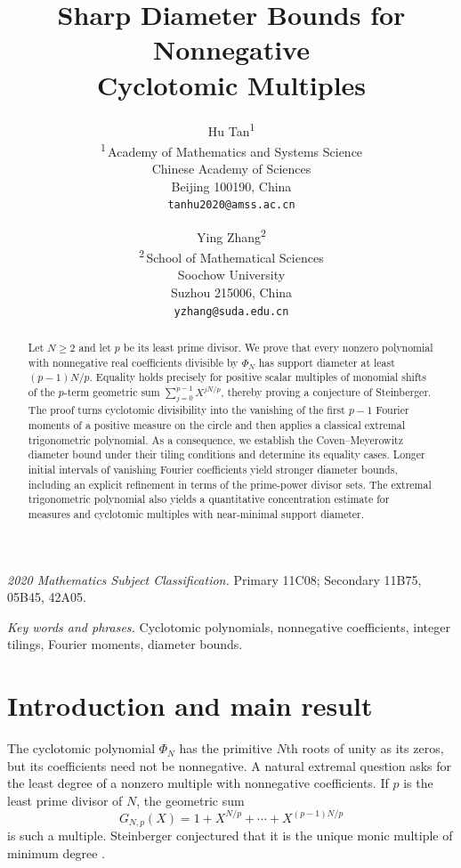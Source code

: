 \documentclass[11pt]{article}
\title{Sharp Diameter Bounds for Nonnegative\\Cyclotomic Multiples}
\author{%
\begin{tabular}[t]{c}
Hu Tan\textsuperscript{1}\\[3pt]
\small\textsuperscript{1}\,Academy of Mathematics and Systems Science\\
\small Chinese Academy of Sciences\\
\small Beijing 100190, China\\
\small\texttt{tanhu2020@amss.ac.cn}
\end{tabular}
\and
\begin{tabular}[t]{c}
Ying Zhang\textsuperscript{2}\\[3pt]
\small\textsuperscript{2}\,School of Mathematical Sciences\\
\small Soochow University\\
\small Suzhou 215006, China\\
\small\texttt{yzhang@suda.edu.cn}
\end{tabular}%
}
\date{}
\theoremstyle{definition}
\theoremstyle{remark}
\numberwithin{equation}{section}
\begin{document}
\maketitle
\begin{abstract}
Let \(N\ge2\) and let \(p\) be its least prime divisor. We prove that every nonzero polynomial with nonnegative real coefficients divisible by \(\Phi_N\) has support diameter at least \((p-1)N/p\). Equality holds precisely for positive scalar multiples of monomial shifts of the \(p\)-term geometric sum \(\sum_{j=0}^{p-1} X^{jN/p}\), thereby proving a conjecture of Steinberger. The proof turns cyclotomic divisibility into the vanishing of the first \(p-1\) Fourier moments of a positive measure on the circle and then applies a classical extremal trigonometric polynomial. As a consequence, we establish the Coven--Meyerowitz diameter bound under their tiling conditions and determine its equality cases. Longer initial intervals of vanishing Fourier coefficients yield stronger diameter bounds, including an explicit refinement in terms of the prime-power divisor sets. The extremal trigonometric polynomial also yields a quantitative concentration estimate for measures and cyclotomic multiples with near-minimal support diameter.


\end{abstract}

\noindent\textit{2020 Mathematics Subject Classification.}
Primary 11C08; Secondary 11B75, 05B45, 42A05.

\smallskip
\noindent\textit{Key words and phrases.}
Cyclotomic polynomials, nonnegative coefficients, integer tilings,
Fourier moments, diameter bounds.

\section{Introduction and main result}

The cyclotomic polynomial $\Phi_N$ has the primitive $N$th roots of unity
as its zeros, but its coefficients need not be nonnegative. A natural
extremal question asks for the least degree of a nonzero
multiple with nonnegative coefficients. If $p$ is the least prime
divisor of $N$, the geometric sum
\begin{equation}\label{eq:fiber}
 G_{N,p}(X)=1+X^{N/p}+\cdots+X^{(p-1)N/p}
\end{equation}
is such a multiple. Steinberger conjectured that it is the unique monic
multiple of minimum degree \cite[Conjecture~1]{Steinberger}.
\end{document}
